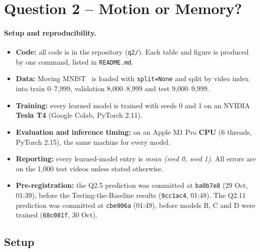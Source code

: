 \documentclass[11pt,a4paper]{article}
\begin{document}
\section{Question 2 -- Motion or Memory?}
\setcounter{figure}{0}\setcounter{table}{0}
\renewcommand{\thefigure}{\arabic{figure}}
\renewcommand{\thetable}{\arabic{table}}

\paragraph{Setup and reproducibility.}
\begin{itemize}
  \item \textbf{Code:} all code is in the repository (\texttt{q2/}). Each table
        and figure is produced by one command, listed in \texttt{README.md}.
  \item \textbf{Data:} Moving MNIST~\cite{srivastava} is loaded with \texttt{split=None} and split
        by video index into train 0--7,999, validation 8,000--8,999 and test
        9,000--9,999.
  \item \textbf{Training:} every learned model is trained with seeds 0 and 1 on
        an NVIDIA \textbf{Tesla T4} (Google Colab, PyTorch 2.11).
  \item \textbf{Evaluation and inference timing:} on an Apple M1 Pro
        \textbf{CPU} (6 threads, PyTorch 2.15), the same machine for every
        model.
  \item \textbf{Reporting:} every learned-model entry is \emph{mean (seed 0,
        seed 1)}. All errors are on the 1,000 test videos unless stated
        otherwise.
  \item \textbf{Pre-registration:} the Q2.5 prediction was committed at
        \texttt{ba0b7e8} (29 Oct, 01:39), before the Testing-the-Baseline
        results (\texttt{9cc1ac4}, 01:48). The Q2.11 prediction was committed at
        \texttt{cbe906a} (01:49), before models B, C and D were trained
        (\texttt{68c081f}, 30 Oct).
\end{itemize}

\subsection{Setup}
\end{document}
